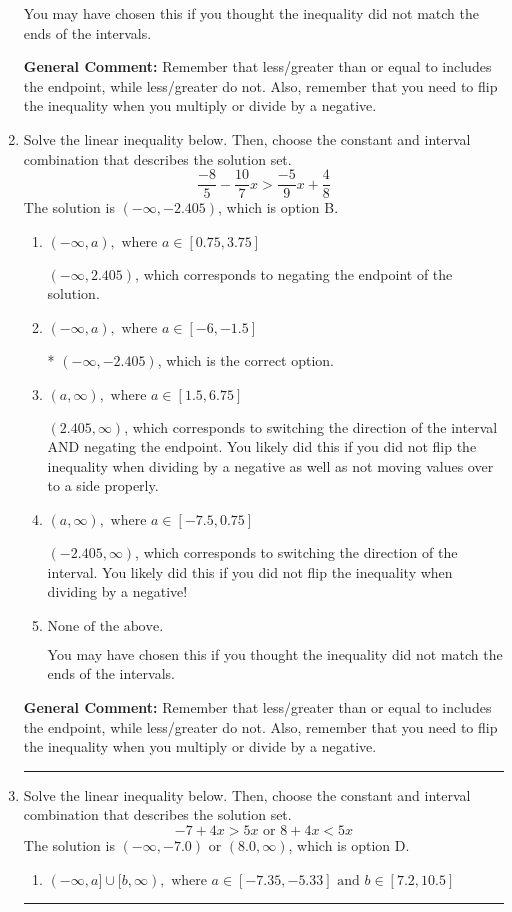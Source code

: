 \documentclass{extbook}[14pt]
\newcommand{\litem}[1]{\item #1

\rule{\textwidth}{0.4pt}}
\begin{document}
\begin{enumerate}
{\begin{enumerate}[label=\Alph*.]
You may have chosen this if you thought the inequality did not match the ends of the intervals.
\end{enumerate}

\textbf{General Comment:} Remember that less/greater than or equal to includes the endpoint, while less/greater do not. Also, remember that you need to flip the inequality when you multiply or divide by a negative.
}
\litem{
Solve the linear inequality below. Then, choose the constant and interval combination that describes the solution set.
\[ \frac{-8}{5} - \frac{10}{7} x > \frac{-5}{9} x + \frac{4}{8} \]The solution is \( (-\infty, -2.405) \), which is option B.\begin{enumerate}[label=\Alph*.]
\item \( (-\infty, a), \text{ where } a \in [0.75, 3.75] \)

 $(-\infty, 2.405)$, which corresponds to negating the endpoint of the solution.
\item \( (-\infty, a), \text{ where } a \in [-6, -1.5] \)

* $(-\infty, -2.405)$, which is the correct option.
\item \( (a, \infty), \text{ where } a \in [1.5, 6.75] \)

 $(2.405, \infty)$, which corresponds to switching the direction of the interval AND negating the endpoint. You likely did this if you did not flip the inequality when dividing by a negative as well as not moving values over to a side properly.
\item \( (a, \infty), \text{ where } a \in [-7.5, 0.75] \)

 $(-2.405, \infty)$, which corresponds to switching the direction of the interval. You likely did this if you did not flip the inequality when dividing by a negative!
\item \( \text{None of the above}. \)

You may have chosen this if you thought the inequality did not match the ends of the intervals.
\end{enumerate}

\textbf{General Comment:} Remember that less/greater than or equal to includes the endpoint, while less/greater do not. Also, remember that you need to flip the inequality when you multiply or divide by a negative.
}
\litem{
Solve the linear inequality below. Then, choose the constant and interval combination that describes the solution set.
\[ -7 + 4 x > 5 x \text{ or } 8 + 4 x < 5 x \]The solution is \( (-\infty, -7.0) \text{ or } (8.0, \infty) \), which is option D.\begin{enumerate}[label=\Alph*.]
\item \( (-\infty, a] \cup [b, \infty), \text{ where } a \in [-7.35, -5.33] \text{ and } b \in [7.2, 10.5] \)


\end{enumerate}}
\end{enumerate}
\end{document}
